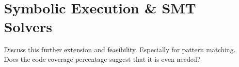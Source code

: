 \chapter{Symbolic Execution \& SMT Solvers}
Discuss this further extension and feasibility. Especially for pattern matching. Does the code coverage percentage suggest that it is even needed?